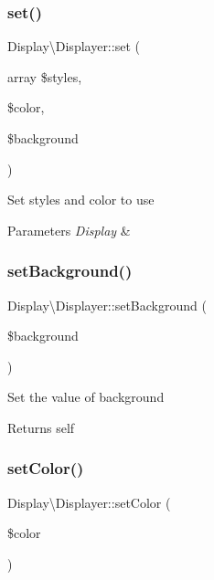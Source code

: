 \subsubsection{\texorpdfstring{set()}{set()}}
{\footnotesize\ttfamily Display\textbackslash{}\+Displayer\+::set (\begin{DoxyParamCaption}\item[{array}]{\$styles,  }\item[{}]{\$color,  }\item[{}]{\$background }\end{DoxyParamCaption})}

Set styles and color to use 
\begin{DoxyParams}{Parameters}
{\em Display} & \\
\hline
\end{DoxyParams}
\mbox{\label{classDisplay_1_1Displayer_ada8b108ad4678f8f94337748db34a062}} 
\subsubsection{\texorpdfstring{set\+Background()}{setBackground()}}
{\footnotesize\ttfamily Display\textbackslash{}\+Displayer\+::set\+Background (\begin{DoxyParamCaption}\item[{}]{\$background }\end{DoxyParamCaption})}

Set the value of background

\begin{DoxyReturn}{Returns}
self 
\end{DoxyReturn}
\mbox{\label{classDisplay_1_1Displayer_a2df23fef055ca84673a9a90f55f3e3ee}} 
\subsubsection{\texorpdfstring{set\+Color()}{setColor()}}
{\footnotesize\ttfamily Display\textbackslash{}\+Displayer\+::set\+Color (\begin{DoxyParamCaption}\item[{}]{\$color }\end{DoxyParamCaption})}

